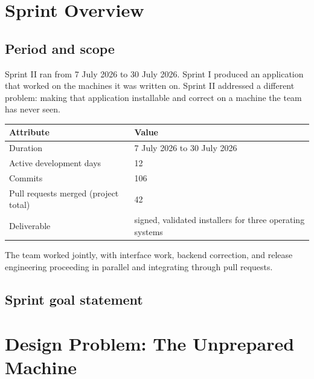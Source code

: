 \documentclass[11pt,a4paper]{article}
\begin{document}

\tableofcontents
\newpage

\section{Sprint Overview}

\subsection{Period and scope}

Sprint II ran from 7 July 2026 to 30 July 2026. Sprint I produced an
application that worked on the machines it was written on. Sprint II addressed
a different problem: making that application installable and correct on a
machine the team has never seen.

\begin{center}
\small
\begin{tabular}{@{}ll@{}}
\toprule
\textbf{Attribute} & \textbf{Value} \\
\midrule
Duration & 7 July 2026 to 30 July 2026 \\
Active development days & 12 \\
Commits & 106 \\
Pull requests merged (project total) & 42 \\
Deliverable & signed, validated installers for three operating systems \\
\bottomrule
\end{tabular}
\end{center}

The team worked jointly, with interface work, backend correction, and release
engineering proceeding in parallel and integrating through pull requests.

\subsection{Sprint goal statement}


\section{Design Problem: The Unprepared Machine}
\end{document}
